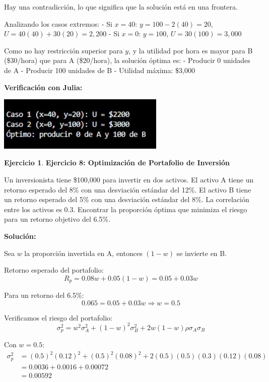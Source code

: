 \documentclass[12pt, a4paper, oneside]{book}
\theoremstyle{definition}
\newtheorem{ejercicio}{Ejercicio}[chapter]
\begin{document}
Hay una contradicción, lo que significa que la solución está en una frontera.

Analizando los casos extremos:
- Si $x = 40$: $y = 100 - 2(40) = 20$, $U = 40(40) + 30(20) = 2,200$
- Si $x = 0$: $y = 100$, $U = 30(100) = 3,000$

Como no hay restricción superior para $y$, y la utilidad por hora es mayor para B (\$30/hora) que para A (\$20/hora), la solución óptima es:
- Producir 0 unidades de A
- Producir 100 unidades de B
- Utilidad máxima: \$3,000

\textbf{Verificación con Julia:}


\begin{center}
\includegraphics[width=0.6\textwidth]{ejercicio7fm.png}
\end{center}

\begin{ejercicio}
\textbf{Ejercicio 8: Optimización de Portafolio de Inversión}

Un inversionista tiene \$100,000 para invertir en dos activos. El activo A tiene un retorno esperado del 8\% con una desviación estándar del 12\%. El activo B tiene un retorno esperado del 5\% con una desviación estándar del 8\%. La correlación entre los activos es 0.3. Encontrar la proporción óptima que minimiza el riesgo para un retorno objetivo del 6.5\%.
\end{ejercicio}

\textbf{Solución:}

Sea $w$ la proporción invertida en A, entonces $(1-w)$ se invierte en B.

Retorno esperado del portafolio:
$$R_p = 0.08w + 0.05(1-w) = 0.05 + 0.03w$$

Para un retorno del 6.5\%:
$$0.065 = 0.05 + 0.03w \Rightarrow w = 0.5$$

Verificamos el riesgo del portafolio:
$$\sigma_p^2 = w^2\sigma_A^2 + (1-w)^2\sigma_B^2 + 2w(1-w)\rho\sigma_A\sigma_B$$

Con $w = 0.5$:
\begin{align*}
\sigma_p^2 &= (0.5)^2(0.12)^2 + (0.5)^2(0.08)^2 + 2(0.5)(0.5)(0.3)(0.12)(0.08) \\
&= 0.0036 + 0.0016 + 0.00072 \\
&= 0.00592
\end{align*}
\end{document}
